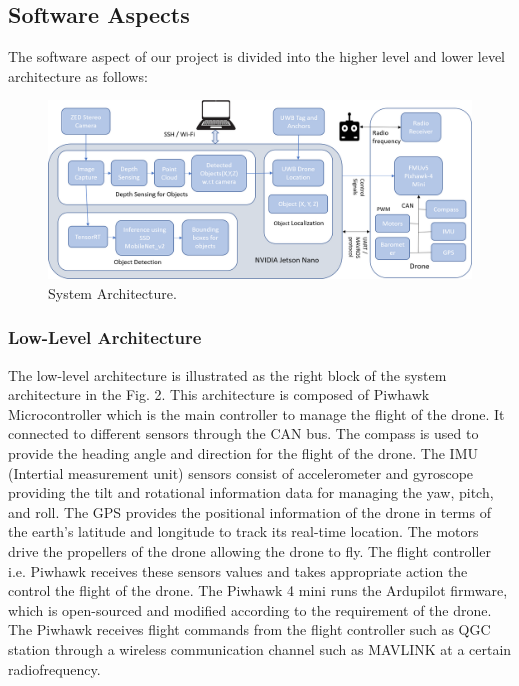 \documentclass{IEEEtran}
\begin{document}
\subsection{Software Aspects}
The software aspect of our project is divided into the higher level and lower level architecture as follows:

\begin{figure}[htb]
\centering
\includegraphics[width=1\linewidth]{fig/block_diagram.png}
\caption{System Architecture.} \label{fig.structure}
\end{figure}

\subsubsection{Low-Level Architecture}
The low-level architecture is illustrated as the right block of the system architecture in the Fig. 2. This architecture is composed of Piwhawk Microcontroller which is the main controller to manage the flight of the drone. It connected to different sensors through the CAN bus. The compass is used to provide the heading angle and direction for the flight of the drone. The IMU (Intertial measurement unit) sensors consist of accelerometer and gyroscope providing the tilt and rotational information data for managing the yaw, pitch, and roll. The GPS provides the positional information of the drone in terms of the earth’s latitude and longitude to track its real-time location. The motors drive the propellers of the drone allowing the drone to fly. The flight controller i.e. Piwhawk receives these sensors values and takes appropriate action the control the flight of the drone. The Piwhawk 4 mini runs the Ardupilot firmware, which is open-sourced and modified according to the requirement of the drone. The Piwhawk receives flight commands from the flight controller such as QGC station through a wireless communication channel such as MAVLINK at a certain radiofrequency.
\end{document}
